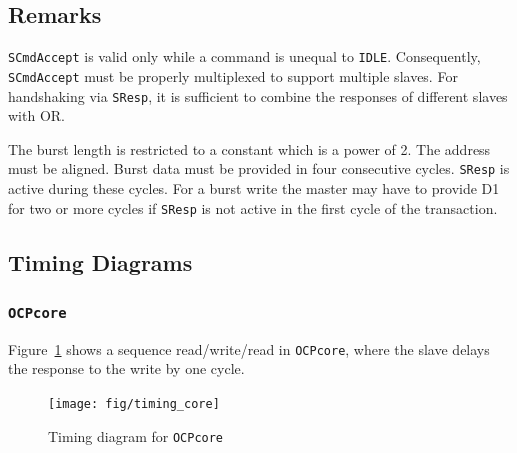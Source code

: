 \documentclass[a4paper,fontsize=10pt,twoside,DIV15,BCOR12mm,headinclude=true,footinclude=false,pagesize,bibtotoc]{scrbook}
\newcommand{\code}[1]{{\texttt{#1}}}
\newcommand{\comment}[3]{

\textsf{\textbf{#1}} {\color{#3}#2}}
\newcommand{\wolf}[1]{\comment{Wolfgang}{#1}{OliveGreen}}
\newcommand{\martin}[1]{\comment{Martin}{#1}{Blue}}
\renewcommand{\wolf}[1]{}
\renewcommand{\martin}[1]{}
\begin{document}
\subsection{Remarks}

\code{SCmdAccept} is valid only while a command is unequal to
\code{IDLE}. Consequently, \code{SCmdAccept} must be properly
multiplexed to support multiple slaves. For handshaking via
\code{SResp}, it is sufficient to combine the responses of different
slaves with OR.

\wolf{\code{OCPburst} currently allows neither pipelining nor
  same-cycle responses. If we want to, we can make it more like
  \code{OCPcore} or \code{OCPio}.}

The burst length is restricted to a constant which is a power of 2.
The address must be aligned.
Burst data must be provided in four consecutive cycles. \code{SResp} is
active during these cycles. For a burst write the master may have to provide
D1 for two or more cycles if \code{SResp} is not active in the first cycle of
the transaction.

\martin{Burst: Is it legal (in our OCP subset) that SCmdAccept comes earlier than SDataAccept?} \wolf{No. Masters can assume that both signals are asserted in the same cycle.}

\martin{Burst: we said that we do not support pipelined requests in burst mode.
So when the slave sets SResp we are not allowing the master to initiate the next
request in the same cycle. Right?} \wolf{Right.}

\clearpage
\subsection{Timing Diagrams}

\subsubsection{\code{OCPcore}}

Figure~\ref{fig:timing_core} shows a sequence read/write/read in
\code{OCPcore}, where the slave delays the response to the write by
one cycle.

\begin{figure}
\centering
\texttt{[image: fig/timing\_core]}
\caption{Timing diagram for \code{OCPcore}}
\label{fig:timing_core}
\end{figure}
\end{document}
